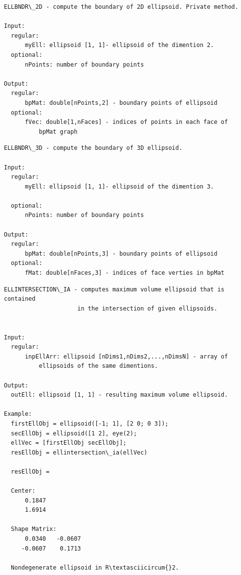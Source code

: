 \documentclass[letterpaper,10pt,english]{sphinxmanual}
\begin{document}
\begin{Verbatim}[commandchars=\\\{\}]
ELLBNDR\_2D - compute the boundary of 2D ellipsoid. Private method.

Input:
  regular:
      myEll: ellipsoid [1, 1]- ellipsoid of the dimention 2.
  optional:
      nPoints: number of boundary points

Output:
  regular:
      bpMat: double[nPoints,2] - boundary points of ellipsoid
  optional:
      fVec: double[1,nFaces] - indices of points in each face of
          bpMat graph
\end{Verbatim}

\begin{Verbatim}[commandchars=\\\{\}]
ELLBNDR\_3D - compute the boundary of 3D ellipsoid.

Input:
  regular:
      myEll: ellipsoid [1, 1]- ellipsoid of the dimention 3.

  optional:
      nPoints: number of boundary points

Output:
  regular:
      bpMat: double[nPoints,3] - boundary points of ellipsoid
  optional:
      fMat: double[nFaces,3] - indices of face verties in bpMat
\end{Verbatim}

\begin{Verbatim}[commandchars=\\\{\}]
ELLINTERSECTION\_IA - computes maximum volume ellipsoid that is contained
                     in the intersection of given ellipsoids.


Input:
  regular:
      inpEllArr: ellipsoid [nDims1,nDims2,...,nDimsN] - array of
          ellipsoids of the same dimentions.

Output:
  outEll: ellipsoid [1, 1] - resulting maximum volume ellipsoid.

Example:
  firstEllObj = ellipsoid([-1; 1], [2 0; 0 3]);
  secEllObj = ellipsoid([1 2], eye(2);
  ellVec = [firstEllObj secEllObj];
  resEllObj = ellintersection\_ia(ellVec)

  resEllObj =

  Center:
      0.1847
      1.6914

  Shape Matrix:
      0.0340   -0.0607
     -0.0607    0.1713

  Nondegenerate ellipsoid in R\textasciicircum{}2.
\end{Verbatim}
\end{document}
